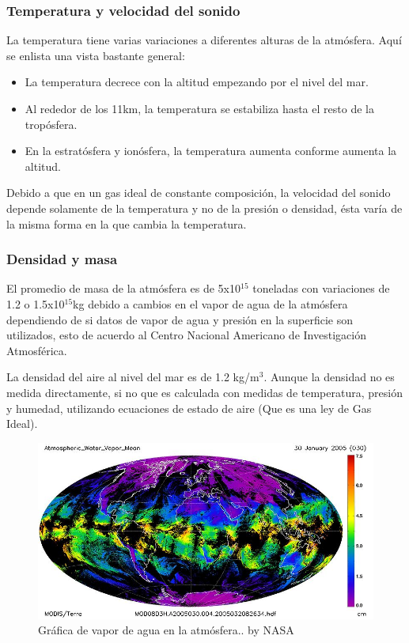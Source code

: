 \documentclass{article}
\begin{document}
\subsubsection{Temperatura y velocidad del sonido}
La temperatura tiene varias variaciones a diferentes alturas de la atmósfera. Aquí se enlista una vista bastante general:
\begin{itemize}
    \item La temperatura decrece con la altitud empezando por el nivel del mar.
    \item Al rededor de los 11km, la temperatura se estabiliza hasta el resto de la tropósfera.
    \item En la estratósfera y ionósfera, la temperatura aumenta conforme aumenta la altitud.
\end{itemize}
Debido a que en un gas ideal de constante composición, la velocidad del sonido depende solamente de la temperatura y no de la presión o densidad, ésta varía de la misma forma en la que cambia la temperatura.

\subsubsection{Densidad y masa}
El promedio de masa de la atmósfera es de 5x10$^15$ toneladas con variaciones de 1.2 o 1.5x10$^15$kg debido a cambios en el vapor de agua de la atmósfera dependiendo de si datos de vapor de agua y presión en la superficie son utilizados, esto de acuerdo al Centro Nacional Americano de Investigación Atmosférica.

La densidad del aire al nivel del mar es de 1.2 kg/m$^3$. Aunque la densidad no es medida directamente, si no que es calculada con medidas de temperatura, presión y humedad, utilizando ecuaciones de estado de aire (Que es una ley de Gas Ideal).



\begin{figure}
    \includegraphics[width=\linewidth]{vapor.jpg}
    \caption{Gráfica de vapor de agua en la atmósfera.. by NASA}
    \label{fig:foto2}
\end{figure}
\end{document}
